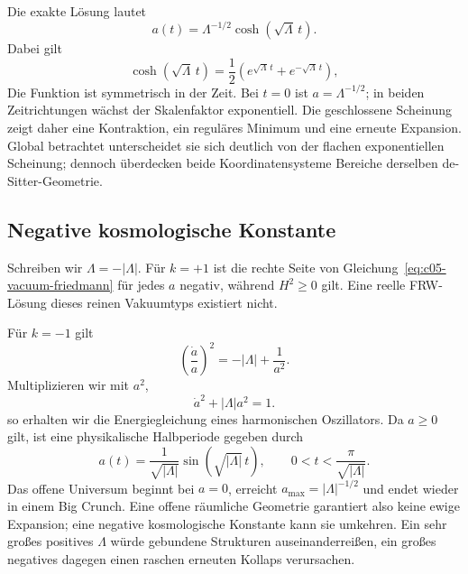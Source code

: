 Die exakte Lösung lautet
\begin{equation}
a(t)=\Lambda^{-1/2}\cosh(\sqrt{\Lambda}\,t).
\label{eq:c05-closed-desitter}
\end{equation}
Dabei gilt
\begin{equation}
\cosh(\sqrt{\Lambda}\,t)
=
\frac12\left(e^{\sqrt{\Lambda}\,t}+e^{-\sqrt{\Lambda}\,t}\right),
\end{equation}
Die Funktion ist symmetrisch in der Zeit. Bei \(t=0\) ist \(a=\Lambda^{-1/2}\); in beiden Zeitrichtungen wächst der Skalenfaktor exponentiell. Die geschlossene Scheinung zeigt daher eine Kontraktion, ein reguläres Minimum und eine erneute Expansion. Global betrachtet unterscheidet sie sich deutlich von der flachen exponentiellen Scheinung; dennoch überdecken beide Koordinatensysteme Bereiche derselben de-Sitter-Geometrie.

\subsection{Negative kosmologische Konstante}

Schreiben wir \(\Lambda=-|\Lambda|\). Für \(k=+1\) ist die rechte Seite von Gleichung~\eqref{eq:c05-vacuum-friedmann} für jedes \(a\) negativ, während \(H^2\geq0\) gilt. Eine reelle FRW-Lösung dieses reinen Vakuumtyps existiert nicht.

Für \(k=-1\) gilt
\begin{equation}
\left(\frac{\dot a}{a}\right)^2=-|\Lambda|+\frac{1}{a^2}.
\end{equation}
Multiplizieren wir mit \(a^2\),
\begin{equation}
\dot a^2+|\Lambda|a^2=1.
\label{eq:c05-negative-lambda-oscillator}
\end{equation}
so erhalten wir die Energiegleichung eines harmonischen Oszillators. Da \(a\geq0\) gilt, ist eine physikalische Halbperiode gegeben durch
\begin{equation}
a(t)=\frac{1}{\sqrt{|\Lambda|}}
\sin\!\left(\sqrt{|\Lambda|}\,t\right),
\qquad
0<t<\frac{\pi}{\sqrt{|\Lambda|}}.
\end{equation}
Das offene Universum beginnt bei \(a=0\), erreicht \(a_{\max}=|\Lambda|^{-1/2}\) und endet wieder in einem Big Crunch. Eine offene räumliche Geometrie garantiert also keine ewige Expansion; eine negative kosmologische Konstante kann sie umkehren. Ein sehr großes positives \(\Lambda\) würde gebundene Strukturen auseinanderreißen, ein großes negatives dagegen einen raschen erneuten Kollaps verursachen.

